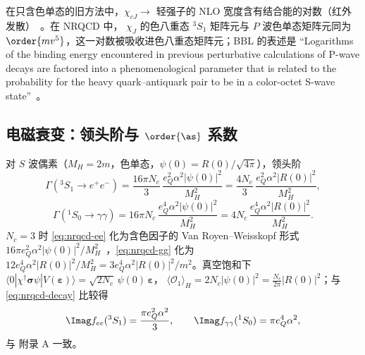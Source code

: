 \begin{example}[$P$ 波衰变的红外对数]\label{ex:nrqcd-pwave}
在只含色单态的旧方法中，$\chi_{cJ}\to$ 轻强子的 NLO 宽度含有结合能的对数（红外发散）~\cite{BarbieriGattoKogerler1976}。在 NRQCD 中，
$\chi_J$ 的色八重态 $^3S_1$ 矩阵元与 $P$ 波色单态矩阵元同为 $\order{mv^5}$，这一对数被吸收进色八重态矩阵元；BBL 的表述是
“Logarithms of the binding energy encountered in previous perturbative calculations of P-wave decays are factored into a phenomenological parameter that is
related to the probability for the heavy quark--antiquark pair to be in a color-octet S-wave state”~\cite{BodwinBraatenLepage1992}。
\end{example}

\subsection{电磁衰变：领头阶与 \texorpdfstring{$\order{\as}$}{O(as)} 系数}

\begin{proposition}[电磁衰变的领头阶]\tagR\label{prop:nrqcd-EM-LO}
对 $S$ 波偶素（$M_H=2m$，色单态，$\psi(0)=R(0)/\sqrt{4\pi}$），领头阶
\begin{equation}\label{eq:nrqcd-ee}
\Gamma(^3S_1\to e^+e^-)=\frac{16\pi N_c}{3}\,\frac{e_Q^2\alpha^2|\psi(0)|^2}{M_H^2}=\frac{4N_c}{3}\,\frac{e_Q^2\alpha^2|R(0)|^2}{M_H^2},
\end{equation}
\begin{equation}\label{eq:nrqcd-gg}
\Gamma(^1S_0\to\gamma\gamma)=16\pi N_c\,\frac{e_Q^4\alpha^2|\psi(0)|^2}{M_H^2}=4N_c\,\frac{e_Q^4\alpha^2|R(0)|^2}{M_H^2}.
\end{equation}
$N_c=3$ 时 \cref{eq:nrqcd-ee} 化为含色因子的 Van Royen--Weisskopf 形式
$16\pi e_Q^2\alpha^2|\psi(0)|^2/M_H^2$~\cite{VanRoyenWeisskopf1967}，\cref{eq:nrqcd-gg} 化为 $12e_Q^4\alpha^2|R(0)|^2/M_H^2=3e_Q^4\alpha^2|R(0)|^2/m^2$。真空饱和下
$\langle0|\chi^\dagger\bm\sigma\psi|V(\bm\varepsilon)\rangle=\sqrt{2N_c}\,\psi(0)\,\bm\varepsilon$，
$\langle\mathcal O_1\rangle_H=2N_c|\psi(0)|^2=\frac{N_c}{2\pi}|R(0)|^2$；与 \cref{eq:nrqcd-decay} 比较得
\begin{equation}\label{eq:nrqcd-Imf}
\Imag f_{ee}(^3S_1)=\frac{\pi e_Q^2\alpha^2}{3},\qquad \Imag f_{\gamma\gamma}(^1S_0)=\pi e_Q^4\alpha^2,
\end{equation}
与 \cite{BodwinBraatenLepage1995} 附录 A 一致。
\end{proposition}

